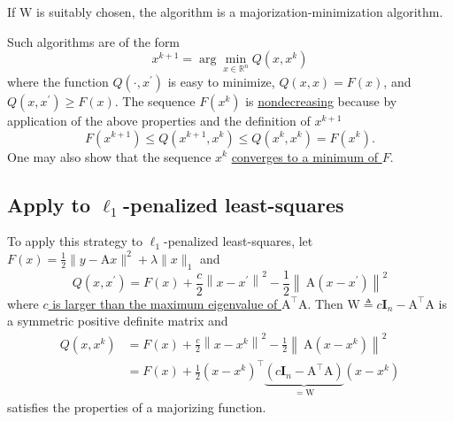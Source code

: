 \documentclass[11pt]{elegantbook}
\begin{document}
If $\mathrm{W}$ is suitably chosen, the algorithm is a majorization-minimization algorithm.
\begin{lemma}
    Such algorithms are of the form
    $$
    x^{k+1}=\arg \min _{x \in \mathbb{R}^n} Q\left(x, x^k\right)
    $$
    where the function $Q\left(\cdot, x^{\prime}\right)$ is easy to minimize, $Q(x, x)=F(x)$, and $Q\left(x, x^{\prime}\right) \geq F(x)$. The sequence $F\left(x^k\right)$ is \underline{nondecreasing} because by application of the above properties and the definition of $x^{k+1}$
    $$
    F\left(x^{k+1}\right) \leq Q\left(x^{k+1}, x^k\right) \leq Q\left(x^k, x^k\right)=F\left(x^k\right) .
    $$
    One may also show that the sequence $x^k$ \underline{converges to a minimum of $F$}.
\end{lemma}

\subsection{Apply to $\ell_1$-penalized least-squares}
To apply this strategy to $\ell_1$-penalized least-squares, let $F(x)=\frac{1}{2}\|y-\mathrm{A} x\|^2+\lambda\|x\|_1$ and
$$
Q\left(x, x^{\prime}\right)=F(x)+\frac{c}{2}\left\|x-x^{\prime}\right\|^2-\frac{1}{2}\left\|\mathrm{~A}\left(x-x^{\prime}\right)\right\|^2
$$
where \underline{$c$ is larger than the maximum eigenvalue of $\mathrm{A}^{\top} \mathrm{A}$}. Then $\mathrm{W} \triangleq c \mathbf{I}_{n}-\mathrm{A}^{\top} \mathrm{A}$ is a symmetric positive definite matrix and
$$
\begin{aligned}
Q\left(x, x^k\right) &=F(x)+\frac{c}{2}\left\|x-x^k\right\|^2-\frac{1}{2}\left\|\mathrm{~A}\left(x-x^k\right)\right\|^2 \\
&=F(x)+\frac{1}{2}\left(x-x^k\right)^{\top} \underbrace{\left(c \mathbf{I}_{n}-\mathrm{A}^{\top} \mathrm{A}\right)}_{=\mathrm{W}}\left(x-x^k\right)
\end{aligned}
$$
satisfies the properties of a majorizing function.
\end{document}
